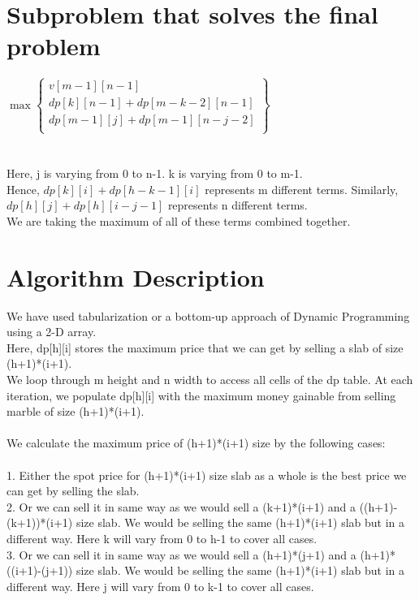 \documentclass{article}
\begin{document}
\section{Subproblem that solves the final problem }
$\max \left\{
\begin{array}{ll}
v[m-1][n-1]\\
dp[k][n-1]+dp[m - k - 2][n-1]\\
dp[m-1][j]+dp[m-1][n - j - 2]\\
\end{array}
\right\}$
\\\\\\
Here, j is varying from 0 to n-1. k is varying from 0 to m-1.\\
Hence, $dp[k][i]+dp[h - k - 1][i]$ represents m different terms. Similarly, $dp[h][j]+dp[h][i - j - 1]$ represents n different terms.\\
We are taking the maximum of all of these terms combined together.


\section{Algorithm Description}
We have used tabularization or a bottom-up approach of Dynamic Programming using a 2-D array.\\

Here, dp[h][i] stores the maximum price that we can get by selling a slab of size (h+1)*(i+1).\\

We loop through m height and n width to access all cells of the dp table. At each iteration, we populate dp[h][i] with the maximum money gainable from selling marble of size (h+1)*(i+1).\\\\

We calculate the maximum price of (h+1)*(i+1) size by the following cases:
\\\\
1.  Either the spot price for (h+1)*(i+1) size slab as a whole is the best price we can get by selling the slab.\\
2.  Or we can sell it in same way as we would sell a (k+1)*(i+1) and a ((h+1)-(k+1))*(i+1) size slab. We would be selling the same (h+1)*(i+1) slab but in a different way. Here k will vary from 0 to h-1 to cover all cases.\\
3.  Or we can sell it in same way as we would sell a (h+1)*(j+1) and a (h+1)*((i+1)-(j+1)) size slab. We would be selling the same (h+1)*(i+1) slab but in a different way. Here j will vary from 0 to k-1 to cover all cases.\\\\
\end{document}
